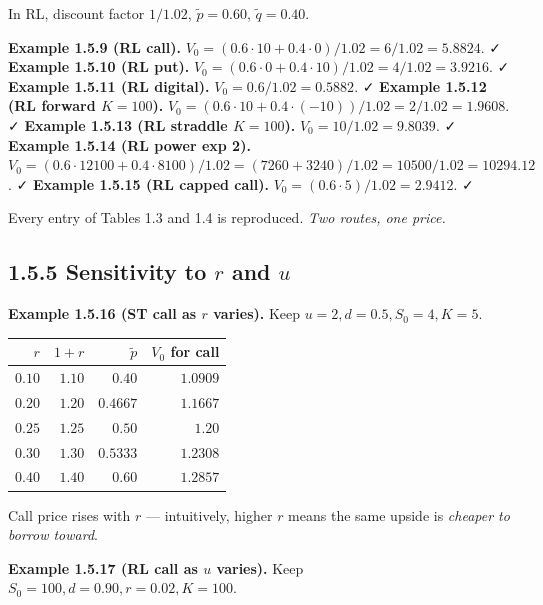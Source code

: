 \documentclass[
  10pt,
  twoside]{book}
\newcounter{none} %
\begin{document}
In RL, discount factor \(1/1.02\), \(\tilde p=0.60\), \(\tilde q=0.40\).

\textbf{Example 1.5.9 (RL call).}
\(V_0=(0.6\cdot 10+0.4\cdot 0)/1.02 = 6/1.02 = 5.8824\). ✓
\textbf{Example 1.5.10 (RL put).}
\(V_0=(0.6\cdot 0 + 0.4\cdot 10)/1.02 = 4/1.02 = 3.9216\). ✓
\textbf{Example 1.5.11 (RL digital).} \(V_0=0.6/1.02=0.5882\). ✓
\textbf{Example 1.5.12 (RL forward \(K=100\)).}
\(V_0=(0.6\cdot 10+0.4\cdot(-10))/1.02 = 2/1.02 = 1.9608\). ✓
\textbf{Example 1.5.13 (RL straddle \(K=100\)).}
\(V_0=10/1.02 = 9.8039\). ✓ \textbf{Example 1.5.14 (RL power exp 2).}
\(V_0=(0.6\cdot 12100+0.4\cdot 8100)/1.02 = (7260+3240)/1.02 = 10500/1.02 = 10294.12\).
✓ \textbf{Example 1.5.15 (RL capped call).}
\(V_0=(0.6\cdot 5)/1.02=2.9412\). ✓

Every entry of Tables 1.3 and 1.4 is reproduced. \emph{Two routes, one
price.}

\subsection{\texorpdfstring{1.5.5 Sensitivity to \(r\) and
\(u\)}{1.5.5 Sensitivity to r and u}}\label{sensitivity-to-r-and-u}

\textbf{Example 1.5.16 (ST call as \(r\) varies).} Keep
\(u=2, d=0.5, S_0=4, K=5\).

{\def\LTcaptype{none} %
\begin{table}[H]
\centering
\begin{tabular}{|r|r|r|r|}
\toprule
\(r\) & \(1+r\) & \(\tilde p\) & \(V_0\) for call \\
\midrule



\(0.10\) & \(1.10\) & \(0.40\) & \(1.0909\) \\
\(0.20\) & \(1.20\) & \(0.4667\) & \(1.1667\) \\
\(0.25\) & \(1.25\) & \(0.50\) & \(1.20\) \\
\(0.30\) & \(1.30\) & \(0.5333\) & \(1.2308\) \\
\(0.40\) & \(1.40\) & \(0.60\) & \(1.2857\) \\
\bottomrule
\end{tabular}
\end{table}
}

Call price rises with \(r\) --- intuitively, higher \(r\) means the same
upside is \emph{cheaper to borrow toward}.

\textbf{Example 1.5.17 (RL call as \(u\) varies).} Keep
\(S_0=100, d=0.90, r=0.02, K=100\).
\end{document}
